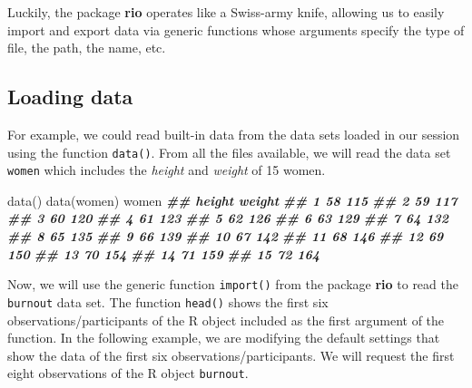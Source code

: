 \documentclass[
]{book}
\newenvironment{Shaded}{\begin{snugshade}}{\end{snugshade}}
\newcommand{\DocumentationTok}[1]{\textcolor[rgb]{0.56,0.35,0.01}{\textbf{\textit{#1}}}}
\newcommand{\FunctionTok}[1]{\textcolor[rgb]{0.00,0.00,0.00}{#1}}
\newcommand{\NormalTok}[1]{#1}
\theoremstyle{definition}
\theoremstyle{definition}
\theoremstyle{definition}
\theoremstyle{definition}
\theoremstyle{remark}
\begin{document}
Luckily, the package \textbf{rio} operates like a Swiss-army knife, allowing us to easily import and export data via generic functions whose arguments specify the type of file, the path, the name, etc.

\hypertarget{loading-data}{%
\subsection{Loading data}\label{loading-data}}

For example, we could read built-in data from the data sets loaded in our session using the function \texttt{data()}. From all the files available, we will read the data set \texttt{women} which includes the \emph{height} and \emph{weight} of 15 women.

\begin{Shaded}
\begin{Highlighting}[]

\FunctionTok{data}\NormalTok{()}
\FunctionTok{data}\NormalTok{(women)}
\NormalTok{women}
\DocumentationTok{\#\#    height weight}
\DocumentationTok{\#\# 1      58    115}
\DocumentationTok{\#\# 2      59    117}
\DocumentationTok{\#\# 3      60    120}
\DocumentationTok{\#\# 4      61    123}
\DocumentationTok{\#\# 5      62    126}
\DocumentationTok{\#\# 6      63    129}
\DocumentationTok{\#\# 7      64    132}
\DocumentationTok{\#\# 8      65    135}
\DocumentationTok{\#\# 9      66    139}
\DocumentationTok{\#\# 10     67    142}
\DocumentationTok{\#\# 11     68    146}
\DocumentationTok{\#\# 12     69    150}
\DocumentationTok{\#\# 13     70    154}
\DocumentationTok{\#\# 14     71    159}
\DocumentationTok{\#\# 15     72    164}
\end{Highlighting}
\end{Shaded}

Now, we will use the generic function \texttt{import()} from the package \textbf{rio} to read the \texttt{burnout} data set. The function \texttt{head()} shows the first six observations/participants of the R object included as the first argument of the function. In the following example, we are modifying the default settings that show the data of the first six observations/participants. We will request the first eight observations of the R object \texttt{burnout}.
\end{document}
